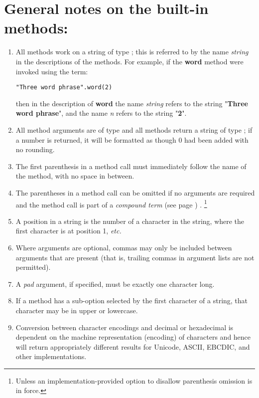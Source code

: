 \section{General notes on the built-in methods:}
\begin{enumerate}
\item All methods work on a \nr{} string of type ; this
is referred to by the name \emph{string} in the descriptions of the
methods.  For example, if the \textbf{word} method were invoked using
the term:
\begin{lstlisting}
"Three word phrase".word(2)
\end{lstlisting}
then in the description of \textbf{word} the name
\emph{string} refers to the string "\textbf{Three word
phrase}", and the name \emph{n} refers to the string
"\textbf{2}".
\item All method arguments are of type  and all methods
return a string of type ; if a number is returned, it
will be formatted as though 0 had been added with no rounding.
\item 
The first parenthesis in a method call must immediately follow the name
of the method, with no space in between.
\item The parentheses in a method call can be omitted if no
arguments are required and the method call is part of a
 \emph{compound term} (see page \pageref{refcomterm}) .
\footnote{
Unless an implementation-provided option to disallow parenthesis
omission is in force.
}
\item A position in a string is the number of a character in the string,
where the first character is at position 1, \emph{etc.}
\item Where arguments are optional, commas may only be included between
arguments that are present (that is, trailing commas in argument lists
are not permitted).
\item A \emph{pad} argument, if specified, must be exactly one
character long.
\item If a method has a sub-option selected by the first character of a
string, that character may be in upper or lowercase.
\item Conversion between character encodings and decimal or hexadecimal
is dependent on the machine representation (encoding) of characters
and hence will return appropriately different results for Unicode,
ASCII, EBCDIC, and other implementations.
\end{enumerate}

